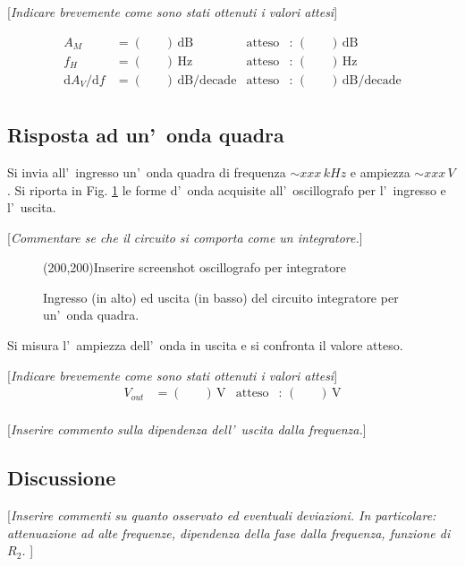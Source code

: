 \documentclass[10pt,a4paper]{article}
\newcommand{\rem}[1]{[\emph{#1}]}
\newcommand{\exn}{\phantom{xxx}}
\begin{document}
	\rem{Indicare brevemente come sono stati ottenuti i valori attesi}
	
	\begin{align*}
	A_M &= (\exn )\,\mathrm{dB} & \mathrm{atteso} &:\,(\exn  )\, \mathrm{dB}  \\
	f_H &= (\exn )\,\mathrm{Hz} & \mathrm{atteso} &:\,(\exn  )\, \mathrm{Hz} \\
	{\mathrm{d}A_V}/{\mathrm{d}f} &= (\exn )\,\mathrm{dB/decade} & \mathrm{atteso} &:\,(\exn  )\, \mathrm{dB/decade}  \\
	\end{align*}
	
	
	\subsection*{Risposta ad un'~onda quadra}
	Si invia all'~ingresso un'~onda quadra di frequenza $\sim xxx\,kHz$ e ampiezza $\sim xxx\,V$.
	Si riporta in Fig. \ref{fig:oscinte} le forme d'~onda acquisite all'~oscillografo per l'~ingresso
	e l'~uscita. 
	
	\rem{Commentare se che il circuito si comporta come un integratore.}
	\begin{figure}[htb]
		\begin{center}
			\framebox(200,200){Inserire screenshot oscillografo per integratore}
		\end{center}
		\caption{\small Ingresso (in alto) ed uscita (in basso) del circuito integratore per un'~onda quadra.}
		\label{fig:oscinte}
	\end{figure}
	
	Si misura l'~ampiezza dell'~onda  in uscita e si confronta il valore atteso.
	
	\rem{Indicare brevemente come sono stati ottenuti i valori attesi}
	\begin{align*}
	V_{out} &= (\exn )\,\mathrm{V} & \mathrm{atteso} &:\,(\exn  )\, \mathrm{V}  \\
	\end{align*}
	
	\rem{Inserire commento sulla dipendenza dell'~uscita dalla frequenza.}
	
	\subsection{Discussione}
	
	\rem{Inserire commenti su quanto osservato ed eventuali deviazioni. 
		In particolare: attenuazione ad alte frequenze, dipendenza della fase dalla frequenza, funzione di $R_2$. }
	
	
\end{document}
